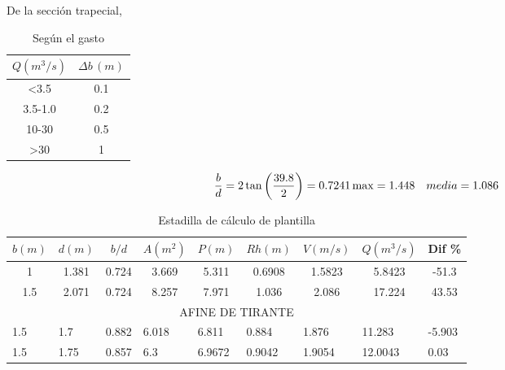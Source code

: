 De la sección trapecial, 
\begin{table}[h!]
    \centering
    \begin{tabular}{@{}cc@{}}
    \toprule
    $Q (m^3/s)$ & $\Delta b\,(m)$ \\ \midrule
    <3.5        & 0.1             \\
    3.5-1.0     & 0.2             \\
    10-30       & 0.5             \\
    >30         & 1               \\ \bottomrule
    \end{tabular}
    \caption{Según el gasto}
    \label{tabhb42}
    \end{table}
\begin{equation*}
\frac{b}{d} = 2 \tan{\left(\frac{39.8}{2}\right)} = 0.7241\\
\max = 1.448\quad media = 1.086
\end{equation*}
\begin{table}[h!]
    \centering
    \begin{tabular}{@{}ccccccccc@{}}
    \toprule
    $b(m)$                  & $d(m)$                   & $b/d$                     & $A(m^2)$                  & $P(m)$                     & $Rh(m)$                    & $V(m/s)$                   & $Q(m^3/s)$                  & Dif  \%                    \\ \midrule
    1                       & 1.381                    & 0.724                     & 3.669                     & 5.311                      & 0.6908                     & 1.5823                     & 5.8423                      & -51.3                      \\
    1.5                     & 2.071                    & 0.724                     & 8.257                     & 7.971                      & 1.036                      & 2.086                      & 17.224                      & 43.53                      \\
    \multicolumn{9}{c}{AFINE DE TIRANTE}                                                                                                                                                                                                                         \\
    \multicolumn{1}{l}{1.5} & \multicolumn{1}{l}{1.7}  & \multicolumn{1}{l}{0.882} & \multicolumn{1}{l}{6.018} & \multicolumn{1}{l}{6.811}  & \multicolumn{1}{l}{0.884}  & \multicolumn{1}{l}{1.876}  & \multicolumn{1}{l}{11.283}  & \multicolumn{1}{l}{-5.903} \\
    \multicolumn{1}{l}{1.5} & \multicolumn{1}{l}{1.75} & \multicolumn{1}{l}{0.857} & \multicolumn{1}{l}{6.3}   & \multicolumn{1}{l}{6.9672} & \multicolumn{1}{l}{0.9042} & \multicolumn{1}{l}{1.9054} & \multicolumn{1}{l}{12.0043} & \multicolumn{1}{l}{0.03}   \\ \bottomrule
    \end{tabular}
    \caption{Estadilla de cálculo de plantilla}
    \label{tabhb43}
\end{table}
